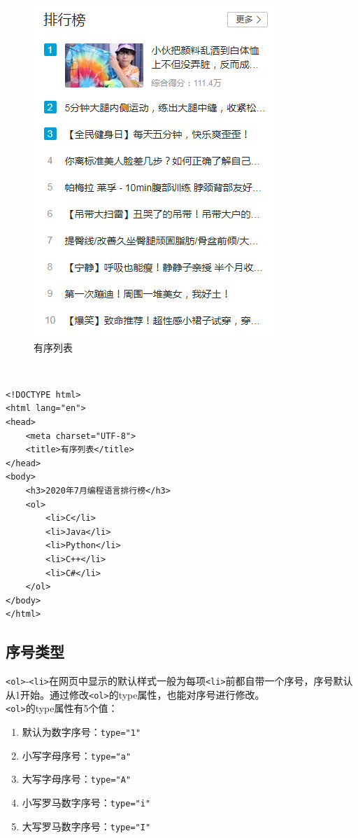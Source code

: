 \begin{figure}[H]
    \centering
    \includegraphics[scale=0.7]{img/C3/3-1/1.png}
    \caption{有序列表}
\end{figure}

 \\
\begin{lstlisting}[style=htmlcssjs]
<!DOCTYPE html>
<html lang="en">
<head>
    <meta charset="UTF-8">
    <title>有序列表</title>
</head>
<body>
    <h3>2020年7月编程语言排行榜</h3>
    <ol>
        <li>C</li>
        <li>Java</li>
        <li>Python</li>
        <li>C++</li>
        <li>C#</li>
    </ol>
</body>
</html>
\end{lstlisting}

\subsection{序号类型}

\lstinline|<ol>|-\lstinline|<li>|在网页中显示的默认样式一般为每项\lstinline|<li>|前都自带一个序号，序号默认从1开始。通过修改\lstinline|<ol>|的type属性，也能对序号进行修改。 \\

\lstinline|<ol>|的type属性有5个值：

\begin{enumerate}
    \item 默认为数字序号：\lstinline|type="1"|
    \item 小写字母序号：\lstinline|type="a"|
    \item 大写字母序号：\lstinline|type="A"|
    \item 小写罗马数字序号：\lstinline|type="i"|
    \item 大写罗马数字序号：\lstinline|type="I"|
\end{enumerate}

